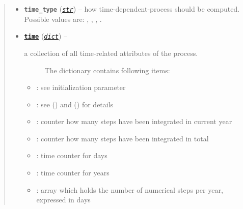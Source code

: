 \documentclass[a4paper,10pt,english]{sphinxmanual}
\begin{document}
\begin{fulllineitems}
\begin{quote}
\begin{description}
\begin{itemize}
\item {} 
\textbf{\texttt{time\_type}} (\href{http://docs.python.org/2.7/library/functions.html\#str}{\emph{\texttt{str}}}) -- how time-dependent-process should be computed. 
Possible values are: , ,
, .

\item {} 
\href{http://docs.python.org/2.7/library/time.html\#module-time}{\textbf{\texttt{time}}} (\href{http://docs.python.org/2.7/library/stdtypes.html\#dict}{\emph{\texttt{dict}}}) -- \begin{description}
\item[{a collection of all time-related attributes of the process. }] \leavevmode
The dictionary contains following items:

\end{description}
\begin{itemize}
\item {} 
: see initialization parameter

\item {} 
: see {\hyperref[api/climlab.process:climlab.process.time_dependent_process.TimeDependentProcess.set_timestep]{\emph{}}} () and {\hyperref[api/climlab.process:climlab.process.time_dependent_process.TimeDependentProcess.timestep]{\emph{}}} () for details

\item {} 
: counter how many steps have been integrated in current year

\item {} 
: counter how many steps have been integrated in total

\item {} 
: time counter for days

\item {} 
: time counter for years

\item {} 
: array which holds the number of numerical steps per year, expressed in days

\end{itemize}



\end{itemize}
\end{description}
\end{quote}
\end{fulllineitems}
\end{document}
